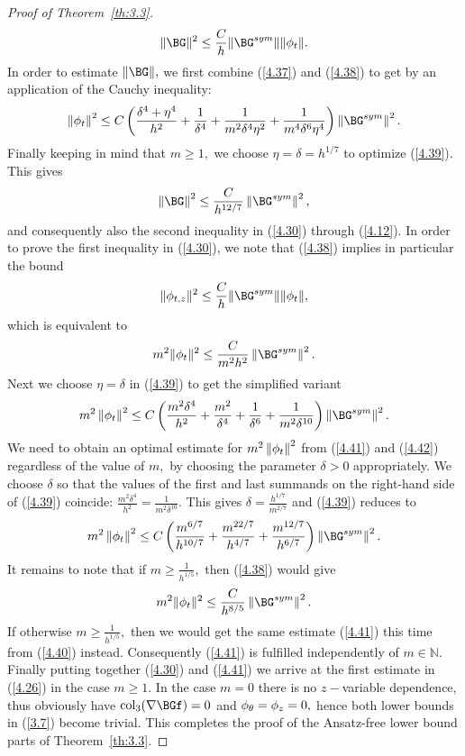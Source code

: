 \begin{proof}[Proof of Theorem~{\ref{th:3.3}}]
\begin{equation}
\label{4.38}
\|\BG\|^2\leq\frac{C}{h}\|\BG^{sym}\|\|\phi_t\|.
\end{equation}
In order to estimate $\|\BG\|,$ we first combine (\ref{4.37}) and (\ref{4.38}) to get by an application of the Cauchy inequality:
\begin{equation}
\label{4.39}
\norm{\phi_t}^2\leq C \left(\frac{\delta^4+\eta^4}{h^2}+\frac{1}{\delta^4}+\frac{1}{m^2 \delta^4 \eta^2}+
 \frac{1}{m^4\delta^6\eta^4}\right)\norm{\BG^{sym}}^2.
\end{equation}
Finally keeping in mind that $m\geq 1,$ we choose $\eta=\delta=h^{1/7}$ to optimize (\ref{4.39}). This gives 
\begin{equation}
\label{4.40}
\norm{\BG}^2\leq \frac{C}{h^{12/7}}\norm{\BG^{sym}}^2,
\end{equation}
and consequently also the second inequality in (\ref{4.30}) through (\ref{4.12}). In order to prove the first inequality in (\ref{4.30}), we note that (\ref{4.38}) implies in particular the bound 
$$\|\phi_{t,z}\|^2\leq \frac{C}{h}\|\BG^{sym}\|\|\phi_t\|,$$
which is equivalent to
\begin{equation}
\label{4.41}
m^2\|\phi_t\|^2 \leq \frac{C}{m^2h^2}\norm{\BG^{sym}}^2.
\end{equation}
Next we choose $\eta=\delta$ in (\ref{4.39}) to get the simplified variant 
\begin{equation}
\label{4.42}
m^2\norm{\phi_t}^2\leq C \left(\frac{m^2\delta^4}{h^2}+\frac{m^2}{\delta^4}+\frac{1}{\delta^6}+
 \frac{1}{m^2\delta^{10}}\right)\norm{\BG^{sym}}^2.
\end{equation}
We need to obtain an optimal estimate for $m^2\left\lVert \phi_t \right\rVert^2$ from (\ref{4.41}) and (\ref{4.42}) regardless of the value of $m,$ by choosing the parameter $\delta>0$ appropriately. We choose $\delta$ so that the values of the first and last summands on the right-hand side of (\ref{4.39}) coincide: 
$\frac{m^2\delta^4}{h^2}=\frac{1}{m^2\delta^{10}}$. This gives $\delta=\frac{h^{1/7}}{m^{2/7}}$ and (\ref{4.39}) reduces to 
\begin{equation}
\label{4.43}
m^2\norm{\phi_t}^2\leq C \left(\frac{m^{6/7}}{h^{10/7}}+\frac{m^{22/7}}{h^{4/7}}+\frac{m^{12/7}}{h^{6/7}}\right)\norm{\BG^{sym}}^2.
\end{equation} 
It remains to note that if $m\geq\frac{1}{ h^{1/5}},$ then (\ref{4.38}) would give 
\begin{equation}
\label{4.44}
m^2\|\phi_t\|^2 \leq \frac{C}{h^{8/5}}\norm{\BG^{sym}}^2.
\end{equation}
If otherwise $m\geq\frac{1}{ h^{1/5}},$ then we would get the same estimate (\ref{4.41}) this time from (\ref{4.40}) instead. Consequently (\ref{4.41}) is fulfilled independently of $m\in\mathbb N.$ Finally putting together (\ref{4.30}) and (\ref{4.41}) we arrive at the first estimate in (\ref{4.26}) in the case $m\geq 1.$ 
In the case $m=0$ there is no $z-$variable dependence, thus obviously have $\mathrm{col}_3(\nabla\BGf)=0$ and $\phi_\theta=\phi_z=0,$ hence both lower bounds in 
(\ref{3.7}) become trivial. This completes the proof of the Ansatz-free lower bound parts of Theorem~\ref{th:3.3}.



\end{proof}

